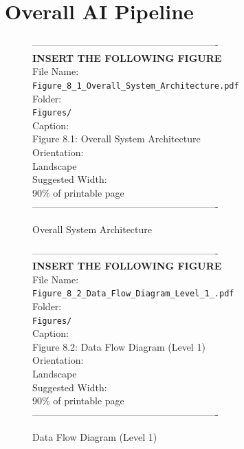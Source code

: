 \documentclass[12pt, a4paper]{report}
\begin{document}
\section{Overall AI Pipeline}
\begin{figure}[htbp]
\begin{center}
----------------------------------------------------------\\
\vspace{0.5em}
\textbf{INSERT THE FOLLOWING FIGURE}\\
\vspace{1em}
File Name:\\
\texttt{Figure\_8\_1\_Overall\_System\_Architecture.pdf}\\
\vspace{1em}
Folder:\\
\texttt{Figures/}\\
\vspace{1em}
Caption:\\
Figure 8.1: Overall System Architecture\\
\vspace{1em}
Orientation:\\
Landscape\\
\vspace{1em}
Suggested Width:\\
90\% of printable page\\
\vspace{3cm}
----------------------------------------------------------
\end{center}
\caption{Overall System Architecture}
\label{fig:diag_1}
\end{figure}
\vspace{1em}
\begin{figure}[htbp]
\begin{center}
----------------------------------------------------------\\
\vspace{0.5em}
\textbf{INSERT THE FOLLOWING FIGURE}\\
\vspace{1em}
File Name:\\
\texttt{Figure\_8\_2\_Data\_Flow\_Diagram\_Level\_1\_.pdf}\\
\vspace{1em}
Folder:\\
\texttt{Figures/}\\
\vspace{1em}
Caption:\\
Figure 8.2: Data Flow Diagram (Level 1)\\
\vspace{1em}
Orientation:\\
Landscape\\
\vspace{1em}
Suggested Width:\\
90\% of printable page\\
\vspace{3cm}
----------------------------------------------------------
\end{center}
\caption{Data Flow Diagram (Level 1)}
\label{fig:diag_14}
\end{figure}
\end{document}
